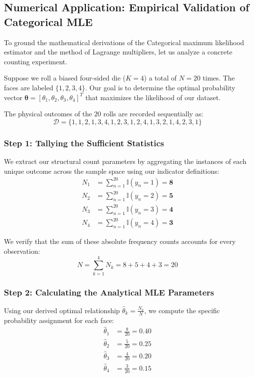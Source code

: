 \documentclass{article}
\begin{document}
\subsection{Numerical Application: Empirical Validation of Categorical MLE}

To ground the mathematical derivations of the Categorical maximum likelihood estimator and the method of Lagrange multipliers, let us analyze a concrete counting experiment. 

Suppose we roll a biased four-sided die ($K = 4$) a total of $N = 20$ times. The faces are labeled $\{1, 2, 3, 4\}$. Our goal is to determine the optimal probability vector $\boldsymbol{\theta} = [\theta_1, \theta_2, \theta_3, \theta_4]^T$ that maximizes the likelihood of our dataset.

The physical outcomes of the $20$ rolls are recorded sequentially as:
\begin{equation}
\mathcal{D} = \{1, 1, 2, 1, 3, 4, 1, 2, 3, 1, 2, 4, 1, 3, 2, 1, 4, 2, 3, 1\}
\end{equation}

\subsubsection{Step 1: Tallying the Sufficient Statistics}
We extract our structural count parameters by aggregating the instances of each unique outcome across the sample space using our indicator definitions:
\begin{align}
N_1 &= \sum_{n=1}^{20} \mathbb{I}(y_n = 1) = \mathbf{8} \\
N_2 &= \sum_{n=1}^{20} \mathbb{I}(y_n = 2) = \mathbf{5} \\
N_3 &= \sum_{n=1}^{20} \mathbb{I}(y_n = 3) = \mathbf{4} \\
N_4 &= \sum_{n=1}^{20} \mathbb{I}(y_n = 4) = \mathbf{3}
\end{align}

We verify that the sum of these absolute frequency counts accounts for every observation:
\begin{equation}
N = \sum_{k=1}^{4} N_k = 8 + 5 + 4 + 3 = 20
\end{equation}

\subsubsection{Step 2: Calculating the Analytical MLE Parameters}
Using our derived optimal relationship $\hat{\theta}_k = \frac{N_k}{N}$, we compute the specific probability assignment for each face:
\begin{align}
\hat{\theta}_1 &= \frac{8}{20} = \mathbf{0.40} \\
\hat{\theta}_2 &= \frac{5}{20} = \mathbf{0.25} \\
\hat{\theta}_3 &= \frac{4}{20} = \mathbf{0.20} \\
\hat{\theta}_4 &= \frac{3}{20} = \mathbf{0.15}
\end{align}
\end{document}
